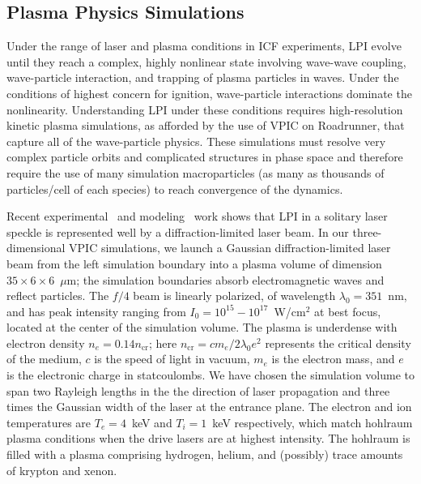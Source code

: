 \documentclass[letter,10pt]{article}
\begin{document}
%
%
\subsection*{Plasma Physics Simulations}

Under the range of laser and plasma conditions in ICF experiments, LPI
evolve until they reach a complex, highly nonlinear state involving
wave-wave coupling, wave-particle interaction, and trapping of plasma
particles in waves.  Under the conditions of highest concern for
ignition, wave-particle interactions dominate the nonlinearity.
Understanding LPI under these conditions requires high-resolution
kinetic plasma simulations, as afforded by the use of VPIC on
Roadrunner, that capture all of the wave-particle physics.  These
simulations must resolve very complex particle orbits and complicated
structures in phase space and therefore require the use of many
simulation macroparticles (as many as thousands of particles/cell of
each species) to reach convergence of the dynamics.~\cite{}

Recent experimental~\cite{} and modeling~\cite{} work shows that LPI
in a solitary laser speckle is represented well by a
diffraction-limited laser beam.  In our three-dimensional VPIC
simulations, we launch a Gaussian diffraction-limited laser beam from
the left simulation boundary into a plasma volume of dimension $35
\times 6 \times 6$~$\mu$m; the simulation boundaries absorb
electromagnetic waves and reflect particles.  The $f/4$ beam is
linearly polarized, of wavelength $\lambda_0 = 351$~nm, and has peak
intensity ranging from $I_0 = 10^{15} - 10^{17}$~W/cm$^2$ at best
focus, located at the center of the simulation volume.  The plasma is
underdense with electron density $n_e = 0.14 n_{\mathrm{cr}}$; here
$n_{\mathrm{cr}} = c m_e / 2 \lambda_0 e^2$ represents the critical
density of the medium, $c$ is the speed of light in vacuum, $m_e$ is
the electron mass, and $e$ is the electronic charge in statcoulombs.
We have chosen the simulation volume to span two Rayleigh lengths in
the the direction of laser propagation and three times the Gaussian
width of the laser at the entrance plane.  The electron and ion
temperatures are $T_e = 4$~keV and $T_i = 1$~keV respectively, which
match hohlraum plasma conditions when the drive lasers are at highest
intensity.  The hohlraum is filled with a plasma comprising hydrogen,
helium, and (possibly) trace amounts of krypton and xenon.
\end{document}
